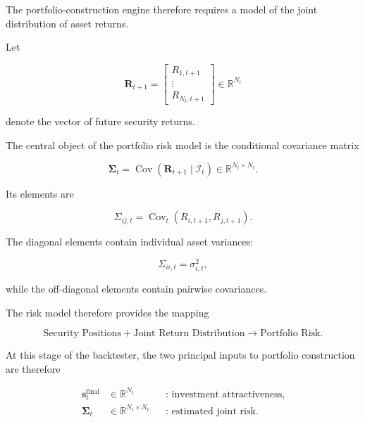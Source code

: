 \documentclass[11pt,a4paper]{article}
\begin{document}
The portfolio-construction engine therefore requires a model of the joint
distribution of asset returns.

Let

\begin{equation}
\mathbf{R}_{t+1}
=
\begin{bmatrix}
R_{1,t+1}\\
\vdots\\
R_{N_t,t+1}
\end{bmatrix}
\in
\mathbb{R}^{N_t}
\end{equation}

denote the vector of future security returns.

The central object of the portfolio risk model is the conditional covariance
matrix

\begin{equation}
\boxed{
\boldsymbol{\Sigma}_t
=
\operatorname{Cov}
\left(
\mathbf{R}_{t+1}
\mid
\mathcal{I}_t
\right)
\in
\mathbb{R}^{N_t\times N_t}.
}
\end{equation}

Its elements are

\begin{equation}
\Sigma_{ij,t}
=
\operatorname{Cov}_t
\left(
R_{i,t+1},
R_{j,t+1}
\right).
\end{equation}

The diagonal elements contain individual asset variances:

\begin{equation}
\Sigma_{ii,t}
=
\sigma_{i,t}^{2},
\end{equation}

while the off-diagonal elements contain pairwise covariances.

The risk model therefore provides the mapping

\begin{equation}
\boxed{
\text{Security Positions}
+
\text{Joint Return Distribution}
\rightarrow
\text{Portfolio Risk}.
}
\end{equation}

At this stage of the backtester, the two principal inputs to portfolio
construction are therefore

\begin{equation}
\boxed{
\begin{aligned}
\mathbf{s}_t^{\mathrm{final}}
&\in
\mathbb{R}^{N_t}
&&
\text{: investment attractiveness},
\\
\boldsymbol{\Sigma}_t
&\in
\mathbb{R}^{N_t\times N_t}
&&
\text{: estimated joint risk}.
\end{aligned}
}
\end{equation}
\end{document}
